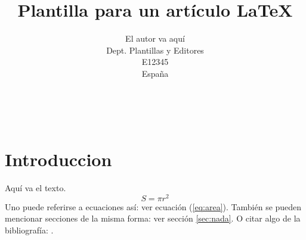%
%



\title{Plantilla para un artículo \LaTeX}
\author{El autor va aquí\\
  \small Dept. Plantillas y Editores\\
  \small E12345\\
  \small España
}


\maketitle

\\

\section{Introduccion}

Aquí va el texto.
\begin{equation}\label{eq:area}
  S = \pi r^2
\end{equation}
Uno puede referirse a ecuaciones así: ver ecuación (\ref{eq:area}).
También se pueden mencionar secciones de la misma forma: ver sección
\ref{sec:nada}. O citar algo de la bibliografía: \cite{Cd94}.


